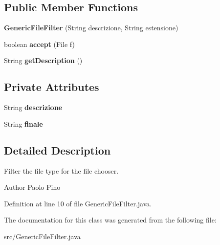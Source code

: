 \subsection*{Public Member Functions}
\begin{DoxyCompactItemize}
\item 
\hypertarget{class_generic_file_filter_a96d78c6c212bfbf0be95a4d10937a89d}{{\bfseries Generic\-File\-Filter} (String descrizione, String estensione)}\label{class_generic_file_filter_a96d78c6c212bfbf0be95a4d10937a89d}

\item 
\hypertarget{class_generic_file_filter_a03eee4e0d87525559746265dc63c9319}{boolean {\bfseries accept} (File f)}\label{class_generic_file_filter_a03eee4e0d87525559746265dc63c9319}

\item 
\hypertarget{class_generic_file_filter_a6918acbc60f5dcff51cb92a9487e2493}{String {\bfseries get\-Description} ()}\label{class_generic_file_filter_a6918acbc60f5dcff51cb92a9487e2493}

\end{DoxyCompactItemize}
\subsection*{Private Attributes}
\begin{DoxyCompactItemize}
\item 
\hypertarget{class_generic_file_filter_a9953e3b3aa3dee91452cb9c2ad80822b}{String {\bfseries descrizione}}\label{class_generic_file_filter_a9953e3b3aa3dee91452cb9c2ad80822b}

\item 
\hypertarget{class_generic_file_filter_a9468f04e6ea80d41e6bc69b59769b751}{String {\bfseries finale}}\label{class_generic_file_filter_a9468f04e6ea80d41e6bc69b59769b751}

\end{DoxyCompactItemize}


\subsection{Detailed Description}
Filter the file type for the file chooser. 

\begin{DoxyAuthor}{Author}
Paolo Pino 
\end{DoxyAuthor}


Definition at line 10 of file Generic\-File\-Filter.\-java.



The documentation for this class was generated from the following file\-:\begin{DoxyCompactItemize}
\item 
src/Generic\-File\-Filter.\-java\end{DoxyCompactItemize}
